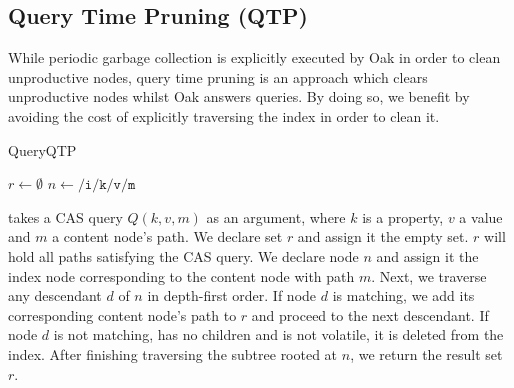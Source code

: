 \message{ !name(thesis.tex)}\documentclass[abstracton,12pt]{scrartcl}
\theoremstyle{definition}
\begin{document}
\newpage

\subsection{Query Time Pruning (QTP)}

While periodic garbage collection is explicitly executed by Oak in order to
clean unproductive nodes, query time pruning is an approach which clears
unproductive nodes whilst Oak answers queries. By doing so, we benefit by
avoiding the cost of explicitly traversing the index in order to clean it.  

\begin{algorithm}
  \caption{QueryQTP}
  \DontPrintSemicolon
  $r \longleftarrow \emptyset$\;
  $n \longleftarrow \texttt{/i/k/v/m}$\;
  \;
  \label{algo:query_qtp_wapi}
\end{algorithm}

 takes a CAS query $Q(k,v,m)$ as an argument, where
$k$ is a property, $v$ a value and $m$ a content node's path. We declare set $r$
and assign it the empty set. $r$ will hold all paths satisfying the CAS query.
We declare node $n$ and assign it the index node corresponding to the content
node with path $m$. Next, we traverse any descendant $d$ of $n$ in depth-first
order. If node $d$ is matching, we add its corresponding content node's path to
$r$ and proceed to the next descendant. If node $d$ is not matching, has no
children and is not volatile, it is deleted from the index. After finishing
traversing the subtree rooted at $n$, we return the result set $r$.
\end{document}
